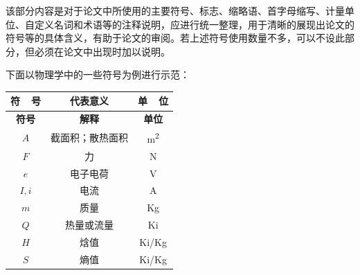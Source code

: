 

\begin{notation}

该部分内容是对于论文中所使用的主要符号、标志、缩略语、首字母缩写、计量单位、自定义名词和术语等的注释说明，应进行统一整理，用于清晰的展现出论文的符号等的具体含义，有助于论文的审阅。若上述符号使用数量不多，可以不设此部分，但必须在论文中出现时加以说明。

下面以物理学中的一些符号为例进行示范：

{\setlength{\tabcolsep}{15mm}%
\begin{longtable}{ccc} %

	\toprule
	{\bf 符~~号} & {\bf 代表意义} & {\bf 单~~位}\\
    \endfirsthead %
    \midrule
    {\bf 符号} & {\bf 解释} & {\bf 单位}\\
    \midrule
    \endhead %
    \midrule
    \endfoot %
    \bottomrule
    \endlastfoot %
    $A$ & 截面积；散热面积 & \unit{m^2} \\
    $F$ & 力 & \unit{N} \\
    $e$ & 电子电荷 & \unit{V} \\
    $I, i$ & 电流 & \unit{A} \\
    $m$ & 质量 & \unit{Kg} \\
    $Q$ & 热量或流量 & \unit{Ki} \\
    $H$ & 焓值 & \unit{Ki/Kg} \\
    $S$ & 熵值 & \unit{Ki/Kg} \\
\end{longtable}}%

\end{notation}
